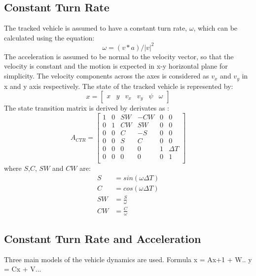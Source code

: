\subsection{Constant Turn Rate}
The tracked vehicle is assumed to have a constant turn rate, $\omega$, which can be calculated using the equation:
\begin{equation*}
\omega = (v * a) / |v|^2
\end{equation*}
The acceleration is assumed to be normal to the velocity vector, so that the velocity is constant and the motion is expected in x-y horizontal plane for simplicity. The velocity components across the axes is considered as $v_x$ and $v_y$ in x and y axis respectively.
The state of the tracked vehicle is represented by:
\begin{equation*}
x = \left[
\begin{matrix}
x & y & v_x & v_y & \psi & \omega
\end{matrix}
\right]
\end{equation*}
The state transition matrix is derived by derivates as :
\begin{equation*}
A_{CTR} = \left[
\begin{matrix}
1 & 0 & SW & -CW & 0 & 0\\
0 & 1 & CW & SW & 0 & 0\\
0 & 0 & C & -S & 0 & 0\\
0 & 0 & S & C & 0 & 0\\
0 & 0 & 0 & 0 & 1 & \Delta T\\
0 & 0 & 0 & 0 & 0 & 1\\
\end{matrix}
\right]
\end{equation*}
where $S$,$C$, $SW$ and $CW$ are:
\begin{equation*}
\begin{split}
S &= sin(\omega \Delta T)\\
C &= cos(\omega \Delta T)\\
SW &= \frac{S}{\omega}\\
CW &= \frac{C}{\omega}
\end{split}
\end{equation*}
\subsection{Constant Turn Rate and Acceleration}
Three main models of the vehicle dynamics are used.
Formula x = Ax+1 + W..
y = Cx + V...

